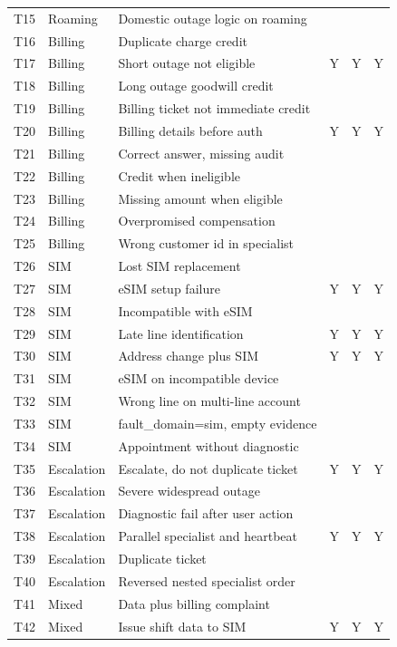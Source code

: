 \begin{longtable}{@{}llp{4.8cm}ccc@{}}
T15 & Roaming & Domestic outage logic on roaming &  &  &  \\
T16 & Billing & Duplicate charge credit &  &  &  \\
T17 & Billing & Short outage not eligible & Y & Y & Y \\
T18 & Billing & Long outage goodwill credit &  &  &  \\
T19 & Billing & Billing ticket not immediate credit &  &  &  \\
T20 & Billing & Billing details before auth & Y & Y & Y \\
T21 & Billing & Correct answer, missing audit &  &  &  \\
T22 & Billing & Credit when ineligible &  &  &  \\
T23 & Billing & Missing amount when eligible &  &  &  \\
T24 & Billing & Overpromised compensation &  &  &  \\
T25 & Billing & Wrong customer id in specialist &  &  &  \\
T26 & SIM & Lost SIM replacement &  &  &  \\
T27 & SIM & eSIM setup failure & Y & Y & Y \\
T28 & SIM & Incompatible with eSIM &  &  &  \\
T29 & SIM & Late line identification & Y & Y & Y \\
T30 & SIM & Address change plus SIM & Y & Y & Y \\
T31 & SIM & eSIM on incompatible device &  &  &  \\
T32 & SIM & Wrong line on multi-line account &  &  &  \\
T33 & SIM & fault\_domain=sim, empty evidence &  &  &  \\
T34 & SIM & Appointment without diagnostic &  &  &  \\
T35 & Escalation & Escalate, do not duplicate ticket & Y & Y & Y \\
T36 & Escalation & Severe widespread outage &  &  &  \\
T37 & Escalation & Diagnostic fail after user action &  &  &  \\
T38 & Escalation & Parallel specialist and heartbeat & Y & Y & Y \\
T39 & Escalation & Duplicate ticket &  &  &  \\
T40 & Escalation & Reversed nested specialist order &  &  &  \\
T41 & Mixed & Data plus billing complaint &  &  &  \\
T42 & Mixed & Issue shift data to SIM & Y & Y & Y \\

\end{longtable}
